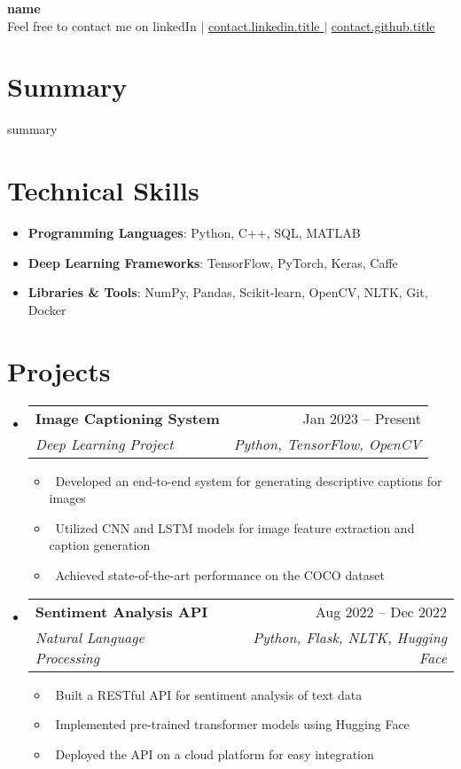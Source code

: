 \documentclass[a4paper,11pt]{article}
\makeatletter
\newcommand{\resumeItem}[1]{\item\small{#1}}
\newcommand{\resumeSubheading}[4]{
\vspace{-1pt}\item
  \begin{tabular*}{0.97\textwidth}[t]{l@{\extracolsep{\fill}}r}
    \textbf{#1} & #2 \\
    \textit{#3} & \textit{#4} \\
  \end{tabular*}\vspace{-7pt}
}
\newcommand{\resumeSubHeadingList}{\begin{itemize}[leftmargin=0.15in, label={}]}
\newcommand{\resumeSubHeadingListEnd}{\end{itemize}}
\makeatother
\begin{document}
\begin{center}
  \textbf{\Huge {{ name }}} \\
  \small Feel free to contact me on linkedIn $|$
  \href{ {{ contact.linkedin.url }} }{ {{ contact.linkedin.title }} } $|$
  \href{ {{ contact.github.url }} }{ {{ contact.github.title }} }
\end{center}

\section*{Summary}
{{ summary }}

\section{Technical Skills}
\resumeSubHeadingList
  \resumeItem{\textbf{Programming Languages}: Python, C++, SQL, MATLAB}
  \resumeItem{\textbf{Deep Learning Frameworks}: TensorFlow, PyTorch, Keras, Caffe}
  \resumeItem{\textbf{Libraries \& Tools}: NumPy, Pandas, Scikit-learn, OpenCV, NLTK, Git, Docker}
\resumeSubHeadingListEnd

\section{Projects}
\resumeSubHeadingList
  \resumeSubheading
      {Image Captioning System}{Jan 2023 -- Present}
      {Deep Learning Project}{Python, TensorFlow, OpenCV}
      \resumeSubHeadingList
          \resumeItem{\textbullet\ Developed an end-to-end system for generating descriptive captions for images}
          \resumeItem{\textbullet\ Utilized CNN and LSTM models for image feature extraction and caption generation}
          \resumeItem{\textbullet\ Achieved state-of-the-art performance on the COCO dataset}
      \resumeSubHeadingListEnd
  \resumeSubheading
      {Sentiment Analysis API}{Aug 2022 -- Dec 2022}
      {Natural Language Processing}{Python, Flask, NLTK, Hugging Face}
      \resumeSubHeadingList
          \resumeItem{\textbullet\ Built a RESTful API for sentiment analysis of text data}
          \resumeItem{\textbullet\ Implemented pre-trained transformer models using Hugging Face}
          \resumeItem{\textbullet\ Deployed the API on a cloud platform for easy integration}
      \resumeSubHeadingListEnd
\resumeSubHeadingListEnd
\end{document}
